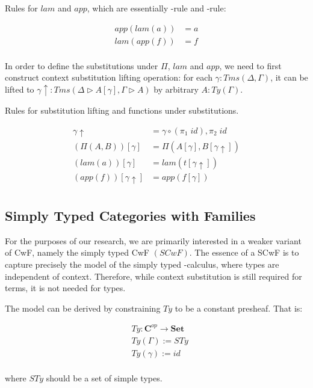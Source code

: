 Rules for $lam$ and $app$, which are essentially \beta-rule and \eta-rule:

\begin{align*}
  app (lam (a)) & = a \\
  lam (app (f)) & = f \\
\end{align*}

In order to define the substitutions under $\Pi$, $lam$ and $app$, we need to first construct context substitution lifting operation: for each $\gamma : Tms (\Delta, \Gamma)$, it can be lifted to $\gamma \uparrow : Tms (\Delta \triangleright A [\gamma], \Gamma \triangleright A)$ by arbitrary $A : Ty(\Gamma)$.

Rules for substitution lifting and functions under substitutions.

\begin{align*}
  \gamma \uparrow & = \gamma \circ (\pi_1\;id) , \pi_2\;id \\
  (\Pi(A,B)) [\gamma] &= \Pi (A [\gamma], B [\gamma \uparrow]) \\
  (lam (a)) [\gamma] &= lam (t [\gamma \uparrow]) \\
  (app (f)) [\gamma \uparrow] &= app (f [\gamma]) \\
\end{align*}

\subsection{Simply Typed Categories with Families}

For the purposes of our research, we are primarily interested in a weaker variant of CwF, namely the simply typed CwF $(SCwF)$. The essence of a SCwF is to capture precisely the model of the simply typed \lambda-calculus, where types are independent of context. Therefore, while context substitution is still required for terms, it is not needed for types.

The model can be derived by constraining $Ty$ to be a constant presheaf. That is:

\begin{align*}
  & Ty : \textbf{C}^{op} \to \textbf{Set} \\
  & Ty(\Gamma) := STy \\
  & Ty(\gamma) := id \\
\end{align*}

where $STy$ should be a set of simple types.

